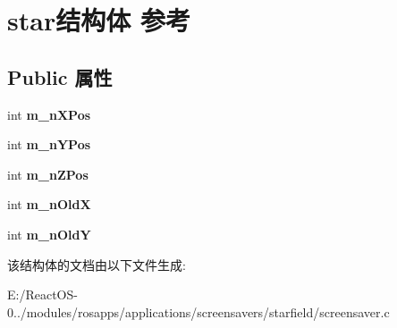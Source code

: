 \hypertarget{structstar}{}\section{star结构体 参考}
\label{structstar}
\subsection*{Public 属性}
\begin{DoxyCompactItemize}
\item 
\mbox{\label{structstar_a0af9c2c41da09d0ae06f8cd331711f20}} 
int {\bfseries m\+\_\+n\+X\+Pos}
\item 
\mbox{\label{structstar_a63b31e2bee7e5858675a21cb2873e3ef}} 
int {\bfseries m\+\_\+n\+Y\+Pos}
\item 
\mbox{\label{structstar_a7c6c271d448c142bed547cd994fa855a}} 
int {\bfseries m\+\_\+n\+Z\+Pos}
\item 
\mbox{\label{structstar_afae970d26d33da6b475877e5ad19d6aa}} 
int {\bfseries m\+\_\+n\+OldX}
\item 
\mbox{\label{structstar_afea3a297761463dcb4d4917ddb096db8}} 
int {\bfseries m\+\_\+n\+OldY}
\end{DoxyCompactItemize}


该结构体的文档由以下文件生成\+:\begin{DoxyCompactItemize}
\item 
E\+:/\+React\+O\+S-\/0../modules/rosapps/applications/screensavers/starfield/screensaver.\+c\end{DoxyCompactItemize}
